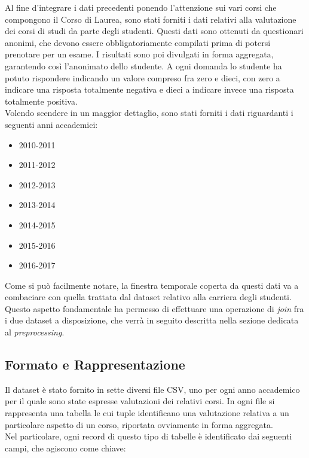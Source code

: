 Al fine d'integrare i dati precedenti ponendo l'attenzione sui vari corsi che compongono il Corso di Laurea, sono stati forniti i dati relativi alla valutazione dei corsi di studi da parte degli studenti. Questi dati sono ottenuti da questionari anonimi, che devono essere obbligatoriamente compilati prima di potersi prenotare per un esame. I risultati sono poi divulgati in forma aggregata, garantendo così l'anonimato dello studente. A ogni domanda lo studente ha potuto rispondere indicando un valore compreso fra zero e dieci, con zero a indicare una risposta totalmente negativa e dieci a indicare invece una risposta totalmente positiva.\\

Volendo scendere in un maggior dettaglio, sono stati forniti i dati riguardanti i seguenti anni accademici:

\begin{itemize}
	\item 2010-2011
	\item 2011-2012
	\item 2012-2013
	\item 2013-2014
	\item 2014-2015
	\item 2015-2016
	\item 2016-2017
\end{itemize}

Come si può facilmente notare, la finestra temporale coperta da questi dati va a combaciare con quella trattata dal dataset relativo alla carriera degli studenti. Questo aspetto fondamentale ha permesso di effettuare una operazione di \textit{join} fra i due dataset a disposizione, che verrà in seguito descritta nella sezione dedicata al \textit{preprocessing}.

\subsection{Formato e Rappresentazione}

Il dataset è stato fornito in sette diversi file CSV, uno per ogni anno accademico per il quale sono state espresse valutazioni dei relativi corsi. In ogni file si rappresenta una tabella le cui tuple identificano una valutazione relativa a un particolare aspetto di un corso, riportata ovviamente in forma aggregata. \\

\noindent Nel particolare, ogni record di questo tipo di tabelle è identificato dai seguenti campi, che agiscono come chiave:

